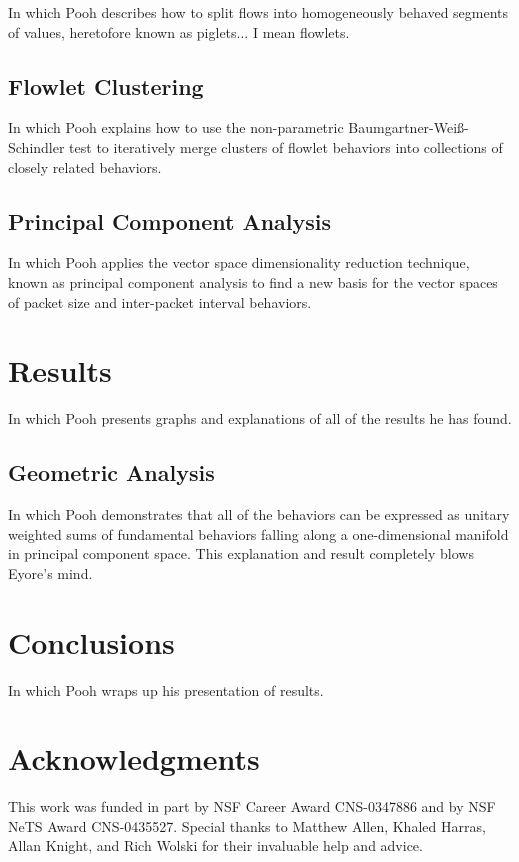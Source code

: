 \documentclass[conference]{IEEEtran}
\begin{document}
In which Pooh describes how to split flows into homogeneously behaved segments of values, heretofore known as piglets... I mean flowlets.

\subsection{Flowlet Clustering}

In which Pooh explains how to use the non-parametric Baumgartner-Wei\ss-Schindler test to iteratively merge clusters of flowlet behaviors into collections of closely related behaviors.

\subsection{Principal Component Analysis}

In which Pooh applies the vector space dimensionality reduction technique, known as principal component analysis to find a new basis for the vector spaces of packet size and inter-packet interval behaviors.

\section{Results}\label{sec:results}

In which Pooh presents graphs and explanations of all of the results he has found.

\subsection{Geometric Analysis}

In which Pooh demonstrates that all of the behaviors can be expressed as unitary weighted sums of fundamental behaviors falling along a one-dimensional manifold in principal component space. This explanation and result completely blows Eyore's mind.

\section{Conclusions}\label{sec:conclusions}

In which Pooh wraps up his presentation of results.

\section{Acknowledgments}
This work was funded in part by NSF Career Award CNS-0347886 and by NSF NeTS Award CNS-0435527. Special thanks to Matthew Allen, Khaled Harras, Allan Knight, and Rich Wolski for their invaluable help and advice.


\end{document}

